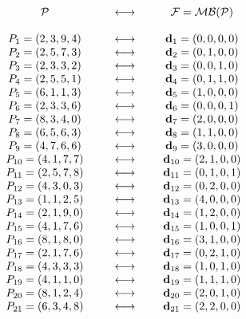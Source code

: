 $$
\begin{array}{ccc}
{\cal  P}&\indent   \longleftrightarrow   &\indent 
{\cal  F}={\cal MB(P)}\\ 
\ &\ &\ \\
P_{1}=(2,3,9,4)&\indent\longleftrightarrow&\indent {\bf d}_{1}=(0,0,0,0)\\
P_{2}=(2,5,7,3)&\indent\longleftrightarrow&\indent {\bf d}_{2}=(0,1,0,0)\\
P_{3}=(2,3,3,2)&\indent\longleftrightarrow&\indent {\bf d}_{3}=(0,0,1,0)\\
P_{4}=(2,5,5,1)&\indent\longleftrightarrow&\indent {\bf d}_{4}=(0,1,1,0)\\
P_{5}=(6,1,1,3)&\indent\longleftrightarrow&\indent {\bf d}_{5}=(1,0,0,0)\\
P_{6}=(2,3,3,6)&\indent\longleftrightarrow&\indent {\bf d}_{6}=(0,0,0,1)\\
P_{7}=(8,3,4,0)&\indent\longleftrightarrow&\indent {\bf d}_{7}=(2,0,0,0)\\
P_{8}=(6,5,6,3)&\indent\longleftrightarrow&\indent {\bf d}_{8}=(1,1,0,0)\\
P_{9}=(4,7,6,6)&\indent\longleftrightarrow&\indent {\bf d}_{9}=(3,0,0,0)\\
P_{10}=(4,1,7,7)&\indent\longleftrightarrow&\indent {\bf d}_{10}=(2,1,0,0)\\
P_{11}=(2,5,7,8)&\indent\longleftrightarrow&\indent {\bf d}_{11}=(0,1,0,1)\\
P_{12}=(4,3,0,3)&\indent\longleftrightarrow&\indent {\bf d}_{12}=(0,2,0,0)\\
P_{13}=(1,1,2,5)&\indent\longleftrightarrow&\indent {\bf d}_{13}=(4,0,0,0)\\
P_{14}=(2,1,9,0)&\indent\longleftrightarrow&\indent {\bf d}_{14}=(1,2,0,0)\\
P_{15}=(4,1,7,6)&\indent\longleftrightarrow&\indent {\bf d}_{15}=(1,0,0,1)\\
P_{16}=(8,1,8,0)&\indent\longleftrightarrow&\indent {\bf d}_{16}=(3,1,0,0)\\
P_{17}=(2,1,7,6)&\indent\longleftrightarrow&\indent {\bf d}_{17}=(0,2,1,0)\\
P_{18}=(4,3,3,3)&\indent\longleftrightarrow&\indent {\bf d}_{18}=(1,0,1,0)\\
P_{19}=(4,1,1,0)&\indent\longleftrightarrow&\indent {\bf d}_{19}=(1,1,1,0)\\
P_{20}=(8,1,2,4)&\indent\longleftrightarrow&\indent {\bf d}_{20}=(2,0,1,0)\\
P_{21}=(6,3,4,8)&\indent\longleftrightarrow&\indent {\bf d}_{21}=(2,2,0,0)\\

\end{array}$$
